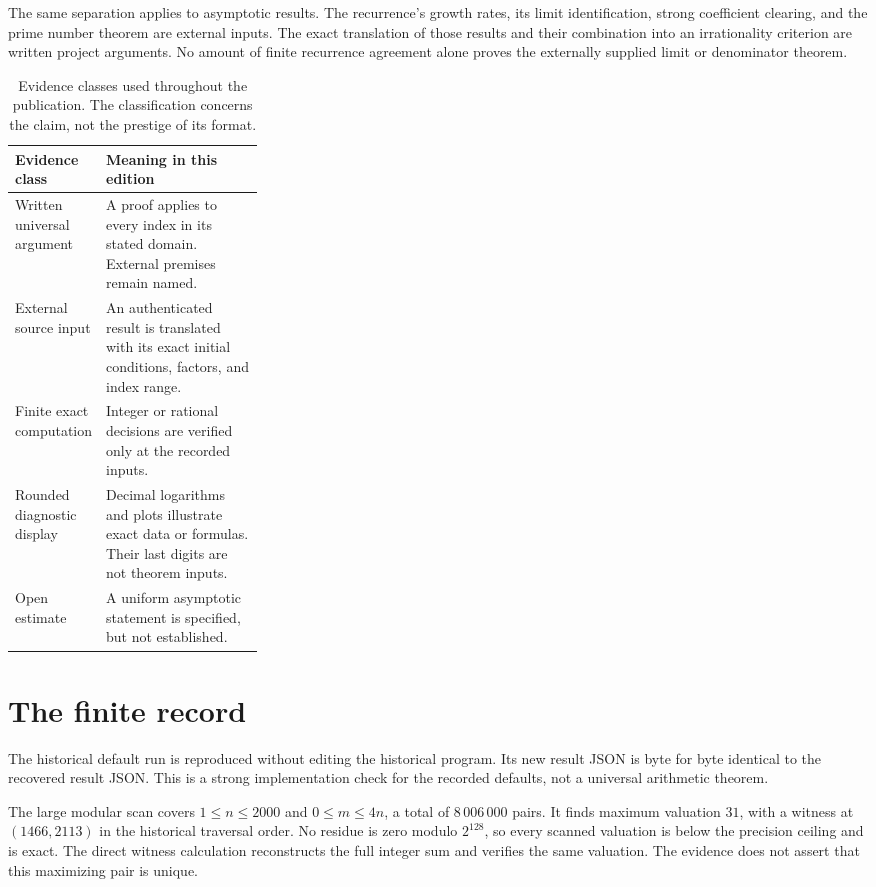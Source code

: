 The same separation applies to asymptotic results. The recurrence's growth rates, its limit identification, strong coefficient clearing, and the prime number theorem are external inputs. The exact translation of those results and their combination into an irrationality criterion are written project arguments. No amount of finite recurrence agreement alone proves the externally supplied limit or denominator theorem.

\begin{table}[htbp]
\centering\small
\begin{tabularx}{\linewidth}{@{}p{0.29\linewidth}X@{}}
\toprule
Evidence class & Meaning in this edition\\
\midrule
Written universal argument & A proof applies to every index in its stated domain. External premises remain named.\\
External source input & An authenticated result is translated with its exact initial conditions, factors, and index range.\\
Finite exact computation & Integer or rational decisions are verified only at the recorded inputs.\\
Rounded diagnostic display & Decimal logarithms and plots illustrate exact data or formulas. Their last digits are not theorem inputs.\\
Open estimate & A uniform asymptotic statement is specified, but not established.\\
\bottomrule
\end{tabularx}
\caption{Evidence classes used throughout the publication. The classification concerns the claim, not the prestige of its format.}
\label{tab:evidence-classes}
\end{table}

\section{The finite record}

The historical default run is reproduced without editing the historical program. Its new result JSON is byte for byte identical to the recovered result JSON. This is a strong implementation check for the recorded defaults, not a universal arithmetic theorem.

The large modular scan covers $1\leq n\leq2000$ and $0\leq m\leq4n$, a total of $8\,006\,000$ pairs. It finds maximum valuation $31$, with a witness at $(1466,2113)$ in the historical traversal order. No residue is zero modulo $2^{128}$, so every scanned valuation is below the precision ceiling and is exact. The direct witness calculation reconstructs the full integer sum and verifies the same valuation. The evidence does not assert that this maximizing pair is unique.


